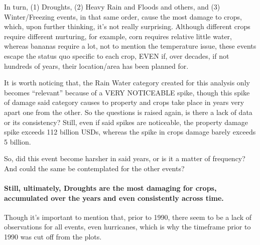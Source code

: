 \documentclass[
]{article}
\begin{document}
In turn, (1) Droughts, (2) Heavy Rain and Floods and others, and (3)
Winter/Freezing events, in that same order, cause the most damage to
crops, which, upon further thinking, it's not really surprising.
Although different crops require different nurturing, for example, corn
requires relative little water, whereas bananas require a lot, not to
mention the temperature issue, these events escape the status quo
specific to each crop, EVEN if, over decades, if not hundreds of years,
their location/area has been planned for.

It is worth noticing that, the Rain Water category created for this
analysis only becomes ``relevant'' because of a VERY NOTICEABLE spike,
though this spike of damage said category causes to property and crops
take place in years very apart one from the other. So the questions is
raised again, is there a lack of data or its consistency? Still, even if
said spikes are noticeable, the property damage spike exceeds 112
billion USDs, whereas the spike in crops damage barely exceeds 5
billion.

So, did this event become harsher in said years, or is it a matter of
frequency? And could the same be contemplated for the other events?

\hypertarget{still-ultimately-droughts-are-the-most-damaging-for-crops-accumulated-over-the-years-and-even-consistently-across-time.}{%
\paragraph{Still, ultimately, Droughts are the most damaging for crops,
accumulated over the years and even consistently across
time.}\label{still-ultimately-droughts-are-the-most-damaging-for-crops-accumulated-over-the-years-and-even-consistently-across-time.}}

Though it's important to mention that, prior to 1990, there seem to be a
lack of observations for all events, even hurricanes, which is why the
timeframe prior to 1990 was cut off from the plots.
\end{document}
